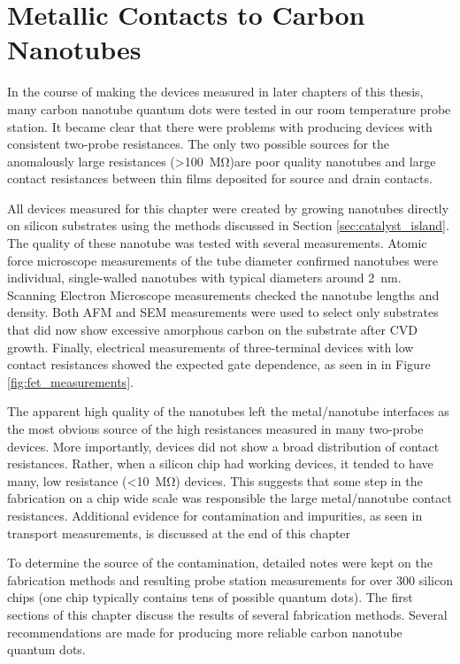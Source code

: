 \chapter{Metallic Contacts to Carbon Nanotubes}
\label{sec:contacts}

In the course of making the devices measured in later chapters of this thesis, many carbon nanotube quantum dots were tested in our room temperature probe station. It became clear that there were problems with producing devices with consistent two-probe resistances. The only two possible sources for the anomalously large resistances (>\SI{100}{\mega\ohm})are poor quality nanotubes and large contact resistances between thin films deposited for source and drain contacts. 

All devices measured for this chapter were created by growing nanotubes directly on silicon substrates using the methods discussed in Section \ref{sec:catalyst_island}. The quality of these nanotube was tested with several measurements. Atomic force microscope measurements of the tube diameter confirmed nanotubes were individual, single-walled nanotubes with typical diameters around \SI{2}{\nano\meter}. Scanning Electron Microscope measurements checked the nanotube lengths and density. Both AFM and SEM measurements were used to select only substrates that did now show excessive amorphous carbon on the substrate after CVD growth. Finally, electrical measurements of three-terminal devices with low contact resistances showed the expected gate dependence, as seen in in Figure \ref{fig:fet_measurements}.

The apparent high quality of the nanotubes left the metal/nanotube interfaces as the most obvious source of the high resistances measured in many two-probe devices. More importantly, devices did not show a broad distribution of contact resistances. Rather, when a silicon chip had working devices, it tended to have many, low resistance (<\SI{10}{\mega\ohm}) devices. This suggests that some step in the fabrication on a chip wide scale was responsible the large metal/nanotube contact resistances. Additional evidence for contamination and impurities, as seen in transport measurements, is discussed at the end of this chapter

To determine the source of the contamination, detailed notes were kept on the fabrication methods and resulting probe station measurements for over 300 silicon chips (one chip typically contains tens of possible quantum dots). The first sections of this chapter discuss the results of several fabrication methods. Several recommendations are made for producing more reliable carbon nanotube quantum dots.

